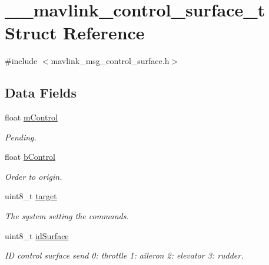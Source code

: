 \hypertarget{struct____mavlink__control__surface__t}{\section{\+\_\+\+\_\+mavlink\+\_\+control\+\_\+surface\+\_\+t Struct Reference}
\label{struct____mavlink__control__surface__t}
}


{\ttfamily \#include $<$mavlink\+\_\+msg\+\_\+control\+\_\+surface.\+h$>$}

\subsection*{Data Fields}
\begin{DoxyCompactItemize}
\item 
float \hyperlink{struct____mavlink__control__surface__t_a24508303e214f7a8ac571976fe221eb1}{m\+Control}
\begin{DoxyCompactList}\small\item\em Pending. \end{DoxyCompactList}\item 
float \hyperlink{struct____mavlink__control__surface__t_a8d376ebc47971a89567df02491f33f69}{b\+Control}
\begin{DoxyCompactList}\small\item\em Order to origin. \end{DoxyCompactList}\item 
uint8\+\_\+t \hyperlink{struct____mavlink__control__surface__t_a1b15ea35cc5a3c18b6dbcb75816b06f8}{target}
\begin{DoxyCompactList}\small\item\em The system setting the commands. \end{DoxyCompactList}\item 
uint8\+\_\+t \hyperlink{struct____mavlink__control__surface__t_ae5bd2f54f6754620be28ff649243cb52}{id\+Surface}
\begin{DoxyCompactList}\small\item\em I\+D control surface send 0\+: throttle 1\+: aileron 2\+: elevator 3\+: rudder. \end{DoxyCompactList}\end{DoxyCompactItemize}


